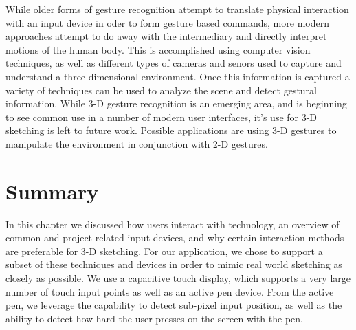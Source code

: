 \documentclass[11pt]{report}
\begin{document}
While older forms of gesture recognition attempt to translate physical interaction with an input device in oder to form gesture based commands, more modern approaches attempt to do away with the intermediary and directly interpret motions of the human body.
This is accomplished using computer vision techniques, as well as different types of cameras and senors used to capture and understand a three dimensional environment.
Once this information is captured a variety of techniques can be used to analyze the scene and detect gestural information. 
While 3-D gesture recognition is an emerging area, and is beginning to see common use in a number of modern user interfaces, it's use for 3-D sketching is left to future work.
Possible applications are using 3-D gestures to manipulate the environment in conjunction with 2-D gestures.

\section{Summary}
In this chapter we discussed how users interact with technology, an overview of common and project related input devices, and why certain interaction methods are preferable for 3-D sketching.
For our application, we chose to support a subset of these techniques and devices in order to mimic real world sketching as closely as possible.
We use a capacitive touch display, which supports a very large number of touch input points as well as an active pen device.
From the active pen, we leverage the capability to detect sub-pixel input position, as well as the ability to detect how hard the user presses on the screen with the pen.
\end{document}
